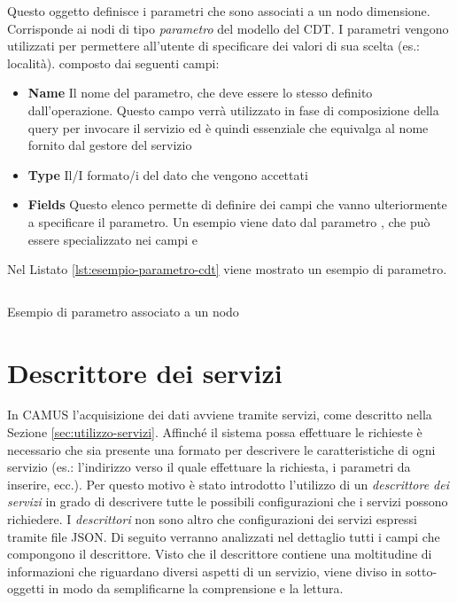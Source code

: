 Questo oggetto definisce i parametri che sono associati a un nodo dimensione. Corrisponde ai nodi di tipo \emph{parametro} del modello del CDT. I parametri vengono utilizzati per permettere all'utente di specificare dei valori di sua scelta (es.: località). \upe composto dai seguenti campi:

\begin{itemize}
	\item \textbf{Name}
	Il nome del parametro, che deve essere lo stesso definito dall'operazione. Questo campo verrà utilizzato in fase di composizione della query per invocare il servizio ed è quindi essenziale che equivalga al nome fornito dal gestore del servizio
	\item \textbf{Type}
	Il/I formato/i del dato che vengono accettati
	\item \textbf{Fields}
	Questo elenco permette di definire dei campi che vanno ulteriormente a specificare il parametro. Un esempio viene dato dal parametro , che può essere specializzato nei campi  e 
\end{itemize}

Nel Listato \ref{lst:esempio-parametro-cdt} viene mostrato un esempio di parametro.

\begin{listing}[H]
	\inputminted{json}{5-implementazione-backend/Codice/esempio_parametro_cdt.json}
	\caption{Esempio di parametro associato a un nodo}
	\label{lst:esempio-parametro-cdt}
\end{listing}

\section{Descrittore dei servizi\label{sec:descrittore-servizi}}

In CAMUS l'acquisizione dei dati avviene tramite servizi, come descritto nella Sezione \ref{sec:utilizzo-servizi}. Affinché il sistema possa effettuare le richieste è necessario che sia presente una formato per descrivere le caratteristiche di ogni servizio (es.: l'indirizzo verso il quale effettuare la richiesta, i parametri da inserire, ecc.). Per questo motivo è stato introdotto l'utilizzo di un \emph{descrittore dei servizi} in grado di descrivere tutte le possibili configurazioni che i servizi possono richiedere. I \emph{descrittori} non sono altro che configurazioni dei servizi espressi tramite file JSON. Di seguito verranno analizzati nel dettaglio tutti i campi che compongono il descrittore. Visto che il descrittore contiene una moltitudine di informazioni che riguardano diversi aspetti di un servizio, viene diviso in sotto-oggetti in modo da semplificarne la comprensione e la lettura.

